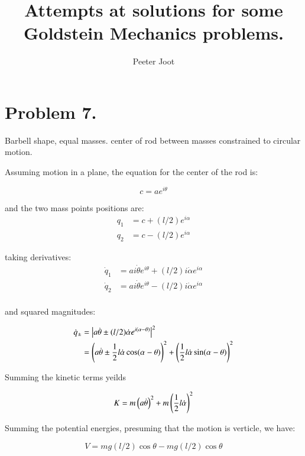 \documentclass{article}      %
\title{Attempts at solutions for some Goldstein Mechanics problems.} %
\author{Peeter Joot}         %
\date{ }        %
\newcommand{\Abs}[1]{\left\lvert{#1}\right\rvert}
\newcommand{\qdot}[0]{\dot{q}}
\newcommand{\dotalpha}[0]{\dot{\alpha}}
\newcommand{\dottheta}[0]{\dot{\theta}}
\begin{document}

\maketitle{}

\section{ Problem 7. }

Barbell shape, equal masses.  center of rod between masses constrained to circular motion.

Assuming motion in a plane, the equation for the center of the rod is:

\begin{equation*}
c = a e^{i\theta}
\end{equation*}

and the two mass points positions are:
\begin{align*}
q_1 &= c + (l/2) e^{i\alpha} \\
q_2 &= c - (l/2) e^{i\alpha}
\end{align*}

taking derivatives:
\begin{align*}
\qdot_1 &= a i \dottheta e^{i\theta} + (l/2) i \dotalpha e^{i\alpha} \\
\qdot_2 &= a i \dottheta e^{i\theta} - (l/2) i \dotalpha e^{i\alpha} \\
\end{align*}

and squared magnitudes:

\begin{align*}
\qdot_{\pm}
&= \Abs{a \dottheta \pm (l/2) \dotalpha e^{i(\alpha - \theta)}}^2 \\
&= \left(a \dottheta   \pm   \inv{2} l \dotalpha \cos(\alpha - \theta)\right)^2 + \left(\inv{2} l \dotalpha \sin(\alpha - \theta)\right)^2
\end{align*}

Summing the kinetic terms yeilds

\begin{equation*}
K = m \left(a \dottheta \right)^2 + m \left(\inv{2} l \dotalpha\right)^2
\end{equation*}

Summing the potential energies, presuming that the motion is verticle, we have:

\begin{equation*}
V = m g (l/2) \cos\theta - m g (l/2) \cos \theta
\end{equation*}
\end{document}
